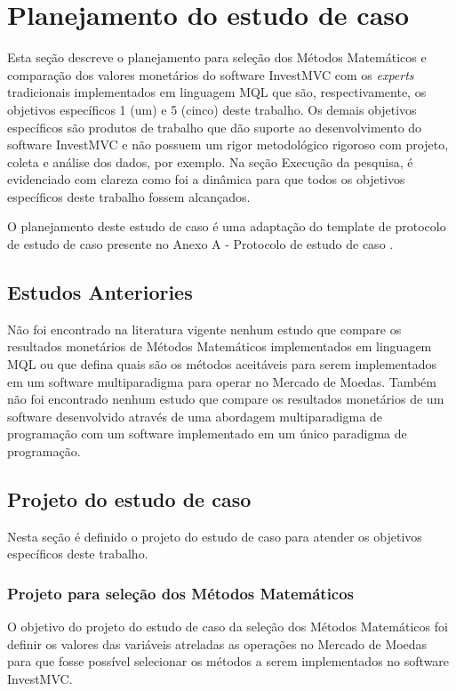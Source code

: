 \section{Planejamento do estudo de caso}

Esta seção descreve o planejamento para seleção dos Métodos Matemáticos e comparação dos valores monetários do software InvestMVC com os \textit{experts} tradicionais implementados em linguagem MQL que são, respectivamente, os objetivos específicos 1 (um) e 5 (cinco) deste trabalho. Os demais objetivos específicos são produtos de trabalho que dão suporte ao desenvolvimento do software InvestMVC e não possuem um rigor metodológico rigoroso com projeto, coleta e análise dos dados, por exemplo. Na seção Execução da pesquisa, é evidenciado com clareza como foi a dinâmica para que todos os objetivos específicos deste trabalho fossem alcançados.

 O planejamento deste estudo de caso é uma adaptação do template de protocolo de estudo de caso presente no Anexo A - Protocolo de estudo de caso \cite{brereton}.

\subsection{Estudos Anteriories}
Não foi encontrado na literatura vigente nenhum estudo que compare os resultados monetários de Métodos Matemáticos implementados em linguagem MQL ou que defina quais são os métodos aceitáveis para serem implementados em um software multiparadigma para operar no Mercado de Moedas. Também não foi encontrado nenhum estudo que compare os resultados monetários de um software desenvolvido através de uma abordagem multiparadigma de programação com um software implementado em um único paradigma de programação.

\subsection{Projeto do estudo de caso}
Nesta seção é definido o projeto do estudo de caso para atender os objetivos específicos deste trabalho.

\subsubsection{Projeto para seleção dos Métodos Matemáticos}
O objetivo do projeto do estudo de caso da seleção dos Métodos Matemáticos foi definir os valores das variáveis atreladas as operações no Mercado de Moedas para que fosse possível selecionar os métodos a serem implementados no software InvestMVC.

